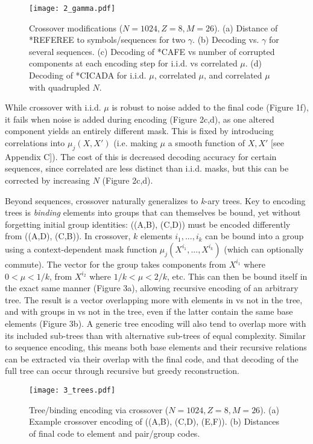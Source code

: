 \documentclass{article}
\begin{document}
\begin{figure}
\label{fig:2}
  \centering
  \texttt{[image: 2\_gamma.pdf]}
  \caption{Crossover modifications ($N=1024, Z=8, M=26$). (a) Distance of *REFEREE to symbols/sequences for two $\gamma$. (b) Decoding vs. $\gamma$ for several sequences. (c) Decoding of *CAFE vs number of corrupted components at each encoding step for i.i.d. vs correlated $\mu$. (d) Decoding of *CICADA for i.i.d. $\mu$, correlated $\mu$, and correlated $\mu$ with quadrupled $N$.}
\end{figure}

While crossover with i.i.d. $\mu$ is robust to noise added to the final code (Figure 1f), it fails when noise is added during encoding (Figure 2c,d), as one altered component yields an entirely different mask. This is fixed by introducing correlations into $\mu_j(X, X')$ (i.e. making $\mu$ a smooth function of $X, X'$ [see Appendix C]). The cost of this is decreased decoding accuracy for certain sequences, since correlated are less distinct than i.i.d. masks, but this can be corrected by increasing $N$ (Figure 2c,d).

Beyond sequences, crossover naturally generalizes to \textit{k}-ary trees. Key to encoding trees is \textit{binding} elements into groups that can themselves be bound, yet without forgetting initial group identities: ((A,B), (C,D)) must be encoded differently from ((A,D), (C,B)). In crossover, $k$ elements $i_1, ..., i_k$ can be bound into a group using a context-dependent mask function $\mu_j(X^{i_1}, ..., X^{i_k})$ (which can optionally commute). The vector for the group takes components from $X^{i_1}$ where $0 < \mu < 1/k$, from $X^{i_2}$ where $1/k < \mu < 2/k$, etc. This can then be bound itself in the exact same manner (Figure 3a), allowing recursive encoding of an arbitrary tree. The result is a vector overlapping more with elements in vs not in the tree, and with groups in vs not in the tree, even if the latter contain the same base elements (Figure 3b). A generic tree encoding will also tend to overlap more with its included sub-trees than with alternative sub-trees of equal complexity. Similar to sequence encoding, this means both base elements and their recursive relations can be extracted via their overlap with the final code, and that decoding of the full tree can occur through recursive but greedy reconstruction.

\begin{figure}
\label{fig:3}
  \centering
  \texttt{[image: 3\_trees.pdf]}
  \caption{Tree/binding encoding via crossover ($N=1024, Z=8, M=26$). (a) Example crossover encoding of ((A,B), (C,D), (E,F)). (b) Distances of final code to element and pair/group codes.}
\end{figure}
\end{document}
